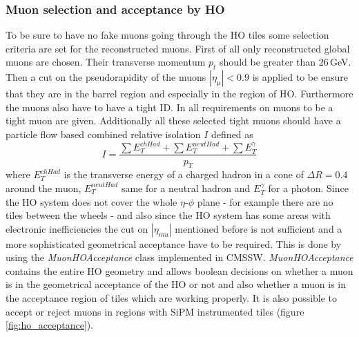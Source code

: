 		\subsubsection{Muon selection and acceptance by HO}
		\label{thesectionhere}
			To be sure to have no fake muons going through the HO tiles some selection criteria are set for the reconstructed muons.
			First of all only reconstructed global muons are chosen.
			Their transverse momentum $p_t$ should be greater than 26\,GeV.
			Then a cut on the pseudorapidity of the muons $|\eta_\mu| < 0.9$ is applied to be ensure that they are in the barrel region and especially in the region of HO.
			Furthermore the muons also have to have a tight ID.
			In \cite{CMS-PAPER-MUO-10-004} all requirements on muons to be a tight muon are given.
			Additionally all these selected tight muons should have a particle flow based combined relative isolation $I$ defined as
			\begin{equation}
				I = \frac{\sum{E_T^{chHad}} + \sum{E_T^{neutHad}} + \sum{E_T^\gamma}}{p_T}
			\end{equation}
			where $E_T^{chHad}$ is the transverse energy of a charged hadron in a cone of $\Delta R = 0.4$ around the muon, $E_T^{neutHad}$ same for a neutral hadron and $E_T^\gamma$ for a photon.
			Since the HO system does not cover the whole $\eta$-$\phi$ plane - for example there are no tiles between the wheels - and also since the HO system has some areas with electronic inefficiencies the
			cut on $|\eta_{mu}|$ mentioned before is not sufficient and a more sophisticated geometrical acceptance have to be required.
			This is done by using the \textit{MuonHOAcceptance} class implemented in CMSSW.
			\textit{MuonHOAcceptance} contains the entire HO geometry and allows boolean decisions on whether a muon is in the geometrical acceptance of the HO or not and also whether a muon is in the
			acceptance region of tiles which are working properly.
			It is also possible to accept or reject muons in regions with SiPM instrumented tiles (figure \ref{fig:ho_acceptance}).
